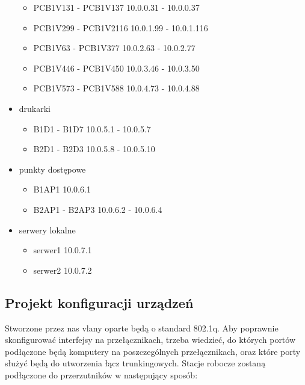 \documentclass[a4paper, 12pt]{article}
\begin{document}
\begin{itemize}
	\begin{itemize}
	\item PCB1V131 - PCB1V137 10.0.0.31 - 10.0.0.37
	\item PCB1V299 - PCB1V2116 10.0.1.99 - 10.0.1.116
	\item PCB1V63 - PCB1V377 10.0.2.63 - 10.0.2.77
	\item PCB1V446 - PCB1V450 10.0.3.46 - 10.0.3.50
	\item PCB1V573 - PCB1V588 10.0.4.73 - 10.0.4.88
	\end{itemize}
\item drukarki
	\begin{itemize}
	\item B1D1 - B1D7 10.0.5.1 - 10.0.5.7
	\item B2D1 - B2D3 10.0.5.8 - 10.0.5.10
	\end{itemize}
\item punkty dostępowe
	\begin{itemize}
	\item B1AP1 10.0.6.1
	\item B2AP1 - B2AP3 10.0.6.2 - 10.0.6.4 
	\end{itemize}
\item serwery lokalne
	\begin{itemize}
	\item serwer1 10.0.7.1
	\item serwer2 10.0.7.2
	\end{itemize}
\end{itemize}

\subsection{Projekt konfiguracji urządzeń}
Stworzone przez nas vlany oparte będą o standard 802.1q. Aby poprawnie skonfigurować interfejsy na przełącznikach, trzeba wiedzieć, do których portów podłączone będą komputery na poszczególnych przełącznikach, oraz które porty służyć będą do utworzenia łącz trunkingowych. Stacje robocze zostaną podłączone do przerzutników w następujący sposób:
\end{document}
